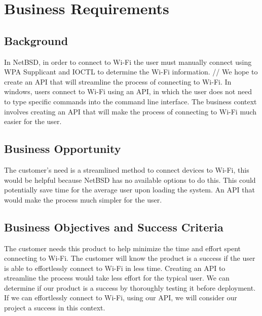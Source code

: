 \section{Business Requirements}
\subsection{Background}

In NetBSD, in order to connect to Wi-Fi the user must manually connect using WPA Supplicant and IOCTL to determine the Wi-Fi information. // We hope to create an API that will streamline the process of connecting to Wi-Fi. In windows, users connect to Wi-Fi using an API, in which the user does not need to type specific commands into the command line interface. The business context involves creating an API that will make the process of connecting to Wi-Fi much easier for the user. 

\subsection{Business Opportunity}

The customer’s need is a streamlined method to connect devices to Wi-Fi, this would be helpful because NetBSD has no available options to do this. This could potentially save time for the average user upon loading the system. An API that would make the process much simpler for the user. 

\subsection{Business Objectives and Success Criteria}

The customer needs this product to help minimize the time and effort spent connecting to Wi-Fi. The customer will know the product is a success if the user is able to effortlessly connect to Wi-Fi in less time. Creating an API to streamline the process would take less effort for the typical user. We can determine if our product is a success by thoroughly testing it before deployment. If we can effortlessly connect to Wi-Fi, using our API, we will consider our project a success in this context. 

